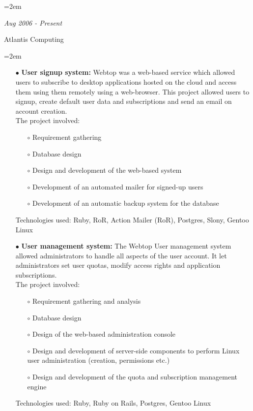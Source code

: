 \documentclass{scrartcl}
\newcommand{\MarginDate}[1]{\marginpar{\raggedleft\itshape\small#1}}
\newlength{\datebox}\settowidth{\datebox}{August 2006 - Present}
\newcommand{\NewWorkExperience}[3]{\noindent\hangindent=2em\hangafter=0 \parbox{\datebox}{\textit{#1}}\hspace{1.5em}
  #2 #3%
\vspace{0.5em}}
\newcommand{\Description}[1]{\hangindent=2em\hangafter=0\noindent\raggedright\footnotesize{#1}\par\normalsize}
\begin{document}
\begin{cv}{
\href{http://www.develmj.com}{}
}
\NewWorkExperience{\small{Aug 2006 - Present}}{\small{Atlantis
    Computing}}{}

\Description{
\begin{itemize}
\item[\footnotesize$\bullet$] \textbf{User signup system: }Webtop was a web-based service which \MarginDate{Atlantis Webtop}allowed users to
    subscribe to desktop applications hosted on the cloud and access them using
    them remotely using a web-browser. This project allowed users to signup,
    create default user data and subscriptions and send an email on account
    creation.\\
    The project involved:
    \begin{itemize}
    \item[\footnotesize$\circ$] Requirement gathering
    \item[\footnotesize$\circ$] Database design
    \item[\footnotesize$\circ$] Design and development of the
      web-based system
    \item[\footnotesize$\circ$] Development of an automated mailer for
      signed-up users
    \item[\footnotesize$\circ$] Development of an automatic backup
      system for the database
    \end{itemize}
    Technologies used: Ruby, RoR, Action Mailer (RoR), Postgres, Slony,
Gentoo Linux
  \item[\footnotesize$\bullet$] \textbf{User management system: }The Webtop User management system allowed
administrators to handle all aspects of the user account. It let administrators
set user quotas, modify access rights and application subscriptions.\\
The project involved:
    \begin{itemize}
    \item[\footnotesize$\circ$] Requirement gathering and analysis
    \item[\footnotesize$\circ$] Database design
    \item[\footnotesize$\circ$] Design of the web-based administration console
    \item[\footnotesize$\circ$] Design and development of server-side components to perform Linux
      user administration (creation, permissions etc.)
    \item[\footnotesize$\circ$] Design and development of the quota and subscription management
engine
    \end{itemize}
    Technologies used: Ruby, Ruby on Rails, Postgres, Gentoo Linux

\end{itemize}}
\end{cv}
\end{document}
